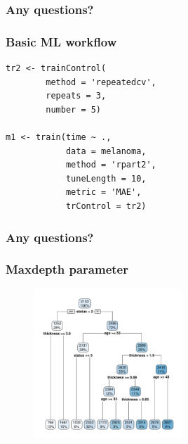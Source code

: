 \documentclass[handout, aspectratio = 169]{beamer}
\begin{document}
\begin{frame}
\frametitle{Any questions?}


\end{frame} 



\begin{frame}[fragile]
\frametitle{Basic ML workflow}
\begin{Verbatim}
tr2 <- trainControl(
        method = 'repeatedcv',
        repeats = 3,
        number = 5)

m1 <- train(time ~ ., 
            data = melanoma,
            method = 'rpart2',
            tuneLength = 10,
            metric = 'MAE',
            trControl = tr2)

\end{Verbatim}

\end{frame} 




\begin{frame}
\frametitle{Any questions?}


\end{frame} 



\begin{frame}
\frametitle{Maxdepth parameter}
\vspace{-4mm}
\begin{figure}
    \includegraphics[width = 0.5\textwidth]{rpart_depth6.pdf}
\end{figure} 

\end{frame} 
\end{document}
